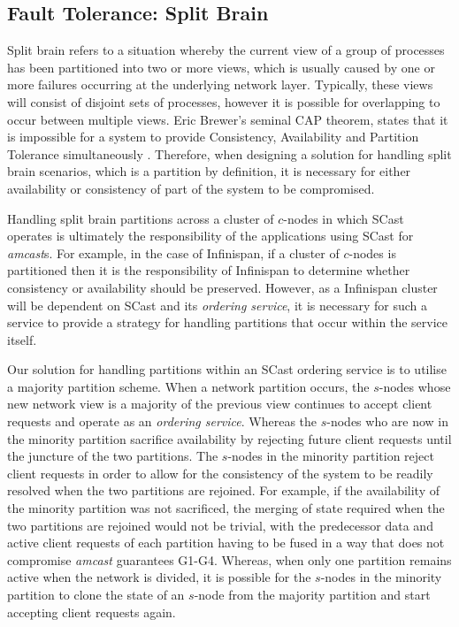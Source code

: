     \subsection{Fault Tolerance: Split Brain}
    Split brain refers to a situation whereby the current view of a group of processes has been partitioned into two or more views, which is usually caused by one or more failures occurring at the underlying network layer. Typically, these views will consist of disjoint sets of processes, however it is possible for overlapping to occur between multiple views.  Eric Brewer's seminal CAP theorem, states that it is impossible for a system to provide Consistency, Availability and Partition Tolerance simultaneously \citep{Brewer:2000:TRD:343477.343502,6133253, Gilbert:2002:BCF:564585.564601}.  Therefore, when designing a solution for handling split brain scenarios, which is a partition by definition, it is necessary for either availability or consistency of part of the system to be compromised.  
    
    Handling split brain partitions across a cluster of $c$-nodes in which \textsf{SCast} operates is ultimately the responsibility of the applications using \textsf{SCast} for \emph{amcast}s.  For example, in the case of Infinispan, if a cluster of $c$-nodes is partitioned then it is the responsibility of Infinispan to determine whether consistency or availability should be preserved.  However, as a Infinispan cluster will be dependent on \textsf{SCast} and its \emph{ordering service}, it is necessary for such a service to provide a strategy for handling partitions that occur within the service itself.  
    
    Our solution for handling partitions within an \textsf{SCast} ordering service is to utilise a majority partition scheme.  When a network partition occurs, the $s$-nodes whose new network view is a majority of the previous view continues to accept client requests and operate as an \emph{ordering service}.  Whereas the $s$-nodes who are now in the minority partition sacrifice availability by rejecting future client requests until the juncture of the two partitions.  The $s$-nodes in the minority partition reject client requests in order to allow for the consistency of the system to be readily resolved when the two partitions are rejoined.  For example, if the availability of the minority partition was not sacrificed, the merging of state required when the two partitions are rejoined would not be trivial, with the predecessor data and active client requests of each partition having to be fused in a way that does not compromise \emph{amcast} guarantees G1-G4.  Whereas, when only one partition remains active when the network is divided, it is possible for the $s$-nodes in the minority partition to clone the state of an $s$-node from the majority partition and start accepting client requests again.  
    
